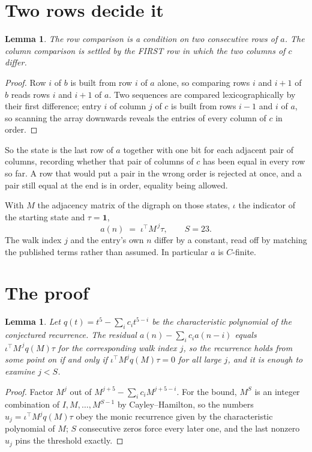 \documentclass[11pt,a4paper]{article}
\theoremstyle{plain}
\newtheorem{lemma}[theorem]{Lemma}
\theoremstyle{definition}
\begin{document}
\section{Two rows decide it}

\begin{lemma}\label{lem:win}
The row comparison is a condition on two consecutive rows of $a$. The column comparison is
settled by the FIRST row in which the two columns of $c$ differ.
\end{lemma}

\begin{proof}
Row $i$ of $b$ is built from row $i$ of $a$ alone, so comparing rows $i$ and $i+1$ of $b$ reads
rows $i$ and $i+1$ of $a$. Two sequences are compared lexicographically by their first
difference; entry $i$ of column $j$ of $c$ is built from rows $i-1$ and $i$ of $a$, so scanning
the array downwards reveals the entries of every column of $c$ in order.
\end{proof}

So the state is the last row of $a$ together with one bit for each adjacent pair of columns,
recording whether that pair of columns of $c$ has been equal in every row so far. A row that
would put a pair in the wrong order is rejected at once, and a pair still equal at the end is
in order, equality being allowed.

With $M$ the adjacency matrix of the digraph on those states, $\iota$ the indicator of the
starting state and $\tau=\mathbf{1}$,
\[
a(n)\;=\;\iota^{\!\top}M^{\,j}\tau ,\qquad S=23.
\]
The walk index $j$ and the entry's own $n$ differ by a constant, read off by matching the
published terms rather than assumed. In particular $a$ is $C$-finite.

\section{The proof}

\begin{lemma}\label{lem:crit}
Let $q(t)=t^{5}-\sum_i c_it^{5-i}$ be the characteristic polynomial of the
conjectured recurrence. The residual $a(n)-\sum_ic_ia(n-i)$ equals
$\iota^{\!\top}M^{\,j}q(M)\tau$ for the corresponding walk index $j$, so the recurrence
holds from some point on if and only if $\iota^{\!\top}M^{j}q(M)\tau=0$ for all large $j$,
and it is enough to examine $j<S$.
\end{lemma}

\begin{proof}
Factor $M^{j}$ out of $M^{j+5}-\sum_ic_iM^{j+5-i}$. For the bound, $M^{S}$
is an integer combination of $I,M,\dots,M^{S-1}$ by Cayley--Hamilton, so the numbers
$u_j=\iota^{\!\top}M^{j}q(M)\tau$ obey the monic recurrence given by the characteristic
polynomial of $M$; $S$ consecutive zeros force every later one, and the last nonzero $u_j$
pins the threshold exactly.
\end{proof}
\end{document}
